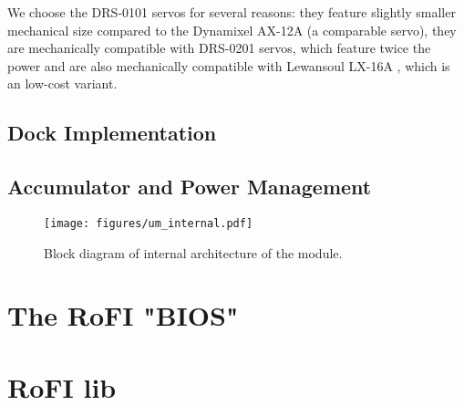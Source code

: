 We choose the DRS-0101 servos for several reasons: they feature slightly smaller
mechanical size compared to the Dynamixel AX-12A (a comparable
servo), they are mechanically compatible with DRS-0201  servos, which
feature twice the power and are also mechanically compatible with Lewansoul
LX-16A , which is an low-cost variant.

\subsection{Dock Implementation}

\subsection{Accumulator and Power Management}



\begin{figure}
    \centering
    \texttt{[image: figures/um\_internal.pdf]}
    \caption{Block diagram of internal architecture of the module.}
    \label{fig:um_internal}
\end{figure}


\section{The RoFI "BIOS" }

\section{RoFI lib}

